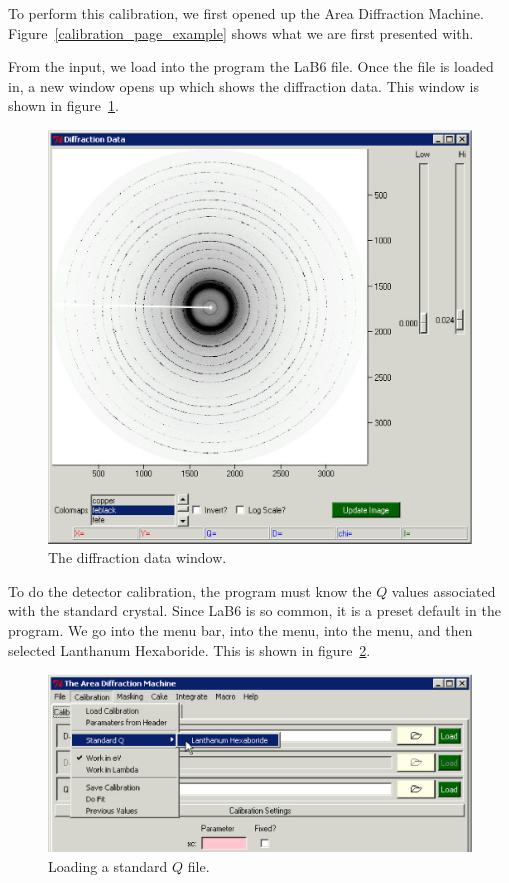 To perform this calibration, we first opened up the Area 
Diffraction Machine. Figure~\ref{calibration_page_example} shows what we
are first presented with.

From the  input, we load into the program the LaB6 
file. Once the file is loaded in, a new window opens up 
which shows the diffraction data. This window is shown in 
figure~\ref{diffraction_data_window_example}.

\begin{figure}
    \centering
    \includegraphics[scale=.75]{figures/diffraction_data_window_example.eps}
    \caption{The diffraction data window.}
    \label{diffraction_data_window_example}
\end{figure}

To do the detector calibration, the program must know the 
$Q$ values associated 
with the standard crystal. Since LaB6 is so common, it is
a preset default in the program. We go into the menu bar, 
into the  menu, into the  menu, 
and then selected Lanthanum Hexaboride. This is shown
in figure~\ref{standard_q_example}.

\begin{figure}
    \centering
    \includegraphics[scale=.75]{figures/standard_q.eps}
    \caption{Loading a standard $Q$ file.}
    \label{standard_q_example}
\end{figure}

